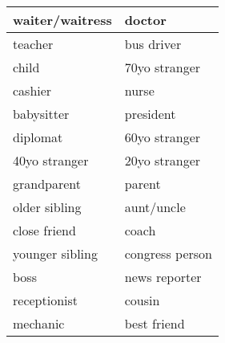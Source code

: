 \documentclass{article}
\date{}
\newcommand{\tabrowEnd}{\rule{0pt}{35pt}\\}
\begin{document}
  \centering
  \noindent
  {\LARGE
    \begin{tabular}{| p{} | p{} |}
      \hline
      waiter/waitress  & doctor \tabrowEnd
      \hline
      teacher          & bus driver \tabrowEnd
      \hline
      child            & 70yo stranger \tabrowEnd
      \hline
      cashier          & nurse \tabrowEnd
      \hline
      babysitter       & president \tabrowEnd
      \hline
      diplomat         & 60yo stranger \tabrowEnd
      \hline
      40yo stranger    & 20yo stranger \tabrowEnd
      \hline
      grandparent      & parent \tabrowEnd
      \hline
      older sibling    & aunt/uncle \tabrowEnd
      \hline
      close friend     & coach \tabrowEnd
      \hline
      younger sibling  & congress person \tabrowEnd
      \hline
      boss             & news reporter \tabrowEnd
      \hline
      receptionist     & cousin \tabrowEnd
      \hline
      mechanic         & best friend \tabrowEnd
      \hline
    \end{tabular}
  }
\end{document}
